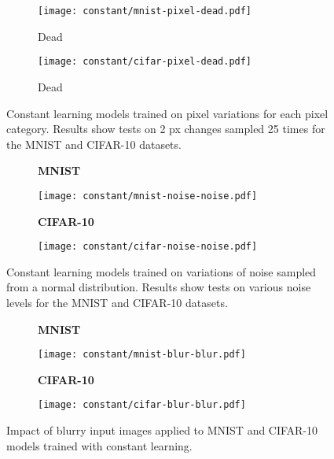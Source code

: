 \documentclass[conference]{IEEEtran}
\begin{document}
\begin{figure}[H]
    \begin{subfigure}[h]{0.30\textwidth}   
        \centering 
        \texttt{[image: constant/mnist-pixel-dead.pdf]}
        \caption{Dead} 
        \label{fig:constant-mnist-dead}
    \end{subfigure}
    \quad
    \begin{subfigure}[h]{0.30\textwidth}   
        \centering 
        \texttt{[image: constant/cifar-pixel-dead.pdf]}
        \caption{Dead} 
        \label{fig:constant-cifar-dead}
    \end{subfigure}
    \captionsetup{width=0.80\linewidth}
    \caption{Constant learning models trained on pixel variations for each pixel category. Results show tests on 2 px changes sampled 25 times for the MNIST and CIFAR-10 datasets.} 
    \label{fig:constant-pixel}
\end{figure}
    
\begin{figure}[H]
    \centering
    \begin{subfigure}[h]{0.30\textwidth}
        \centering
        \textbf{MNIST}\par\medskip
        \texttt{[image: constant/mnist-noise-noise.pdf]}
        \caption{} 
        \label{fig:constant-mnist-noise}
    \end{subfigure}
    \quad
    \begin{subfigure}[h]{0.30\textwidth}  
        \centering 
        \textbf{CIFAR-10}\par\medskip
        \texttt{[image: constant/cifar-noise-noise.pdf]}
        \caption{} 
        \label{fig:constant-cifar-noise}
    \end{subfigure}
    \captionsetup{width=0.80\linewidth}
    \caption{Constant learning models trained on variations of noise sampled from a normal distribution. Results show tests on various noise levels for the MNIST and CIFAR-10 datasets.} 
    \label{fig:constant-noise}
\end{figure}

\begin{figure}[H]
    \centering
    \begin{subfigure}[h]{0.30\textwidth}
        \centering
        \textbf{MNIST}\par\medskip
        \texttt{[image: constant/mnist-blur-blur.pdf]}
        \caption{} 
        \label{fig:constant-mnist-blur}
    \end{subfigure}
    \quad
    \begin{subfigure}[h]{0.30\textwidth}  
        \centering 
        \textbf{CIFAR-10}\par\medskip
        \texttt{[image: constant/cifar-blur-blur.pdf]}
        \caption{} 
        \label{fig:constant-cifar-blur}
    \end{subfigure}
    \captionsetup{width=0.80\linewidth}
    \caption{Impact of blurry input images applied to MNIST and CIFAR-10 models trained with constant learning.} 
    \label{fig:constant-blur}
\end{figure}
\end{document}
